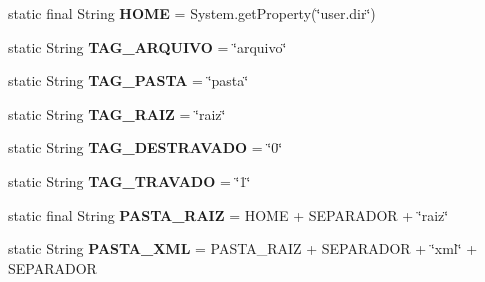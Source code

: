 \begin{DoxyCompactItemize}
\item 
\hypertarget{classutils_1_1_painel_de_controle_a85f3c2c610f0fdde3ee59b52693d8e70}{static final String {\bfseries H\+O\+M\+E} = System.\+get\+Property(\char`\"{}user.\+dir\char`\"{})}\label{classutils_1_1_painel_de_controle_a85f3c2c610f0fdde3ee59b52693d8e70}

\item 
\hypertarget{classutils_1_1_painel_de_controle_ac9f0695b19e0c4ffa11850c8e07e7ba9}{static String {\bfseries T\+A\+G\+\_\+\+A\+R\+Q\+U\+I\+V\+O} = \char`\"{}arquivo\char`\"{}}\label{classutils_1_1_painel_de_controle_ac9f0695b19e0c4ffa11850c8e07e7ba9}

\item 
\hypertarget{classutils_1_1_painel_de_controle_a1b6e644a0a9a0058f7ad76492e1da6ce}{static String {\bfseries T\+A\+G\+\_\+\+P\+A\+S\+T\+A} = \char`\"{}pasta\char`\"{}}\label{classutils_1_1_painel_de_controle_a1b6e644a0a9a0058f7ad76492e1da6ce}

\item 
\hypertarget{classutils_1_1_painel_de_controle_a3d9e923e87c06ab8ddd05f9daf3a78b9}{static String {\bfseries T\+A\+G\+\_\+\+R\+A\+I\+Z} = \char`\"{}raiz\char`\"{}}\label{classutils_1_1_painel_de_controle_a3d9e923e87c06ab8ddd05f9daf3a78b9}

\item 
\hypertarget{classutils_1_1_painel_de_controle_a1b78de30e85056cb926724a57dbd5bab}{static String {\bfseries T\+A\+G\+\_\+\+D\+E\+S\+T\+R\+A\+V\+A\+D\+O} = \char`\"{}0\char`\"{}}\label{classutils_1_1_painel_de_controle_a1b78de30e85056cb926724a57dbd5bab}

\item 
\hypertarget{classutils_1_1_painel_de_controle_af9c7c32c87efffe63b92f285181d35ce}{static String {\bfseries T\+A\+G\+\_\+\+T\+R\+A\+V\+A\+D\+O} = \char`\"{}1\char`\"{}}\label{classutils_1_1_painel_de_controle_af9c7c32c87efffe63b92f285181d35ce}

\item 
\hypertarget{classutils_1_1_painel_de_controle_a272add9646032d411182aee09ff31ad1}{static final String {\bfseries P\+A\+S\+T\+A\+\_\+\+R\+A\+I\+Z} = H\+O\+M\+E + S\+E\+P\+A\+R\+A\+D\+O\+R + \char`\"{}raiz\char`\"{}}\label{classutils_1_1_painel_de_controle_a272add9646032d411182aee09ff31ad1}

\item 
\hypertarget{classutils_1_1_painel_de_controle_aedadf81960e357532be9f761646ba1f8}{static String {\bfseries P\+A\+S\+T\+A\+\_\+\+X\+M\+L} = P\+A\+S\+T\+A\+\_\+\+R\+A\+I\+Z + S\+E\+P\+A\+R\+A\+D\+O\+R + \char`\"{}xml\char`\"{} + S\+E\+P\+A\+R\+A\+D\+O\+R}\label{classutils_1_1_painel_de_controle_aedadf81960e357532be9f761646ba1f8}


\end{DoxyCompactItemize}
